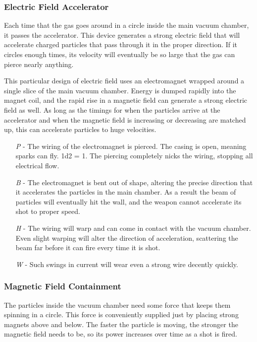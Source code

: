 \documentclass[a4paper]{article}
\begin{document}
\vspace{-0.5cm} \hspace{-18pt} \subsubsection{Electric Field Accelerator} \label{ray_accelerator} \vspace{-0.2cm}
Each time that the gas goes around in a circle inside the main vacuum chamber, it passes the accelerator. This device generates a strong electric field that will accelerate charged particles that pass through it in the proper direction. If it circles enough times, its velocity will eventually be so large that the gas can pierce nearly anything.

This particular design of electric field uses an electromagnet wrapped around a single slice of the main vacuum chamber. Energy is dumped rapidly into the magnet coil, and the rapid rise in a magnetic field can generate a strong electric field as well. As long as the timings for when the particles arrive at the accelerator and when the magnetic field is increasing or decreasing are matched up, this can accelerate particles to huge velocities.
\begin{enumerate}
\item [\textit{P}] - The wiring of the electromagnet is pierced. The casing is open, meaning sparks can fly. \newline \hspace*{3pt} 1d2 = 1. The piercing completely nicks the wiring, stopping all electrical flow.
\item [\textit{B}] - The electromagnet is bent out of shape, altering the precise direction that it accelerates the particles in the main chamber. As a result the beam of particles will eventually hit the wall, and the weapon cannot accelerate its shot to proper speed.
\item [\textit{H}] - The wiring will warp and can come in contact with the vacuum chamber. Even slight warping will alter the direction of acceleration, scattering the beam far before it can fire every time it is shot.
\item [\textit{W}] - Such swings in current will wear even a strong wire decently quickly.
\end{enumerate}

\vspace{-0.5cm} \hspace{-18pt} \subsubsection{Magnetic Field Containment} \label{ray_containment} \vspace{-0.2cm}
The particles inside the vacuum chamber need some force that keeps them spinning in a circle. This force is conveniently supplied just by placing strong magnets above and below. The faster the particle is moving, the stronger the magnetic field needs to be, so its power increases over time as a shot is fired.
\end{document}
